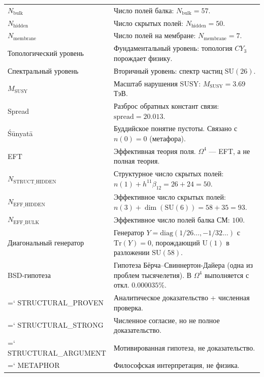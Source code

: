 \documentclass[11pt,a4paper]{article}
\newcommand{\SU}{\mathrm{SU}}
\newcommand{\CY}{CY_3}
\newcommand{\Om}{\Omega^4}
\newcommand{\Nbulk}{N_{\text{bulk}}}
\newcommand{\Nhidden}{N_{\text{hidden}}}
\newcommand{\Nmembrane}{N_{\text{membrane}}}
\newcommand{\MSUSY}{M_{\text{SUSY}}}
\renewcommand{\texttt}[1]{{\ttfamily\hyphenchar\font=`\- #1}}
\theoremstyle{definition}
\begin{document}
\begin{center}
\begin{longtable}{p{3.5cm}p{10cm}}
$\Nbulk$ & 
    Число полей балка: $\Nbulk = 57$. \\[0.3em]

$\Nhidden$ & 
    Число скрытых полей: $\Nhidden = 50$. \\[0.3em]

$\Nmembrane$ & 
    Число полей на мембране: $\Nmembrane = 7$. \\[0.3em]

Топологический уровень & 
    Фундаментальный уровень: топология $\CY$ порождает 
    физику. \\[0.3em]

Спектральный уровень & 
    Вторичный уровень: спектр частиц $\SU(26)$. \\[0.3em]

$\MSUSY$ & 
    Масштаб нарушения SUSY: $\MSUSY = 3.69$ ТэВ. \\[0.3em]

Spread & 
    Разброс обратных констант связи: $\text{spread} = 20.013$. \\[0.3em]

Śūnyatā & 
    Буддийское понятие пустоты. Связано с $n(0) = 0$ 
    (метафора). \\[0.3em]

EFT & 
    Эффективная теория поля. $\Om$ — EFT, а не полная теория. \\[0.3em]

$N_{\text{STRUCT\_HIDDEN}}$ & 
    Структурное число скрытых полей:
    $n(1) + h^{11}\beta_{12} = 26 + 24 = 50$. \\[0.3em]

$N_{\text{EFF\_HIDDEN}}$ & 
    Эффективное число скрытых полей:
    $n(3) + \dim(\SU(6)) = 58 + 35 = 93$. \\[0.3em]

$N_{\text{EFF\_BULK}}$ & 
    Эффективное число полей балка СМ: $100$. \\[0.3em]

Диагональный генератор & 
    Генератор $Y = \mathrm{diag}(1/26 \ldots, -1/32 \ldots)$
    с $\mathrm{Tr}(Y) = 0$, порождающий $\mathrm{U}(1)$
    в разложении $\SU(58)$. \\[0.3em]

BSD-гипотеза & 
    Гипотеза Бёрча--Свиннертон-Дайера (одна из проблем
    тысячелетия). В $\Om$ выполняется с откл. $0.000035\%$. \\[0.3em]

\texttt{STRUCTURAL\_PROVEN} & 
    Аналитическое доказательство + численная проверка. \\[0.3em]

\texttt{STRUCTURAL\_STRONG} & 
    Численное согласие, но не полное доказательство. \\[0.3em]

\texttt{STRUCTURAL\_ARGUMENT} & 
    Мотивированная гипотеза, не доказательство. \\[0.3em]

\texttt{METAPHOR} & 
    Философская интерпретация, не физика. \\

\end{longtable}
\end{center}
\end{document}
